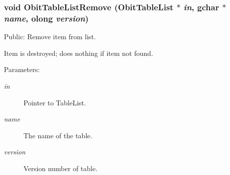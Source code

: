\subsubsection{\setlength{\rightskip}{0pt plus 5cm}void Obit\-Table\-List\-Remove ({\bf Obit\-Table\-List} $\ast$ {\em in}, gchar $\ast$ {\em name}, {\bf olong} {\em version})}\label{ObitTableList_8c_a17}


Public: Remove item from list. 

Item is destroyed; does nothing if item not found. \begin{Desc}
\item[Parameters:]
\begin{description}
\item[{\em in}]Pointer to Table\-List. \item[{\em name}]The name of the table. \item[{\em version}]Version number of table. \end{description}
\end{Desc}
